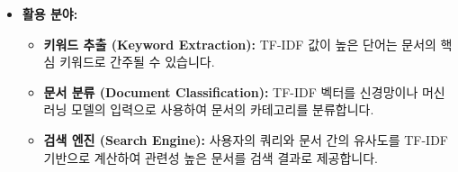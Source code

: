 \documentclass[11pt,a4paper]{article}
\theoremstyle{definition}
\begin{document}
\begin{itemize}
\begin{itemize}
        \item \textbf{목적:} 계산된 TF-IDF 벡터의 길이를 1로 만들어 단위 벡터(unit vector)로 변환합니다.
        \item \textbf{방법:} 각 벡터의 모든 요소를 해당 벡터의 L2 노름(Euclidean distance, 유클리드 거리)으로 나눕니다.
        $$ \text{정규화된 벡터 } \mathbf{v}' = \frac{\mathbf{v}}{||\mathbf{v}||_2} $$
        \item \textbf{L2 노름:} $||\mathbf{v}||_2 = \sqrt{v_1^2 + v_2^2 + \dots + v_k^2}$
        \item \textbf{효과:}
            \begin{itemize}
                \item \textbf{문서 길이의 영향 감소:} 문서의 길이가 길다고 해서 TF-IDF 벡터의 길이가 무조건 길어지는 것을 방지합니다.
                \item \textbf{방향성 강조:} 벡터의 '방향'에 초점을 맞춰 문서 간의 유사도를 측정할 때 '코사인 유사성(Cosine Similarity)'을 직접적으로 사용할 수 있게 합니다. 두 단위 벡터의 내적(dot product)은 두 벡터 사이의 코사인 값과 동일합니다.
                \item \textbf{모델 안정성:} 신경망의 입력으로 사용될 때, 입력 값의 스케일을 일정하게 유지하여 학습의 안정성을 높일 수 있습니다.
            \end{itemize}
        \item \textbf{논의:} TF 계산 시 이미 문서 길이로 나누어 정규화하는데, 최종적으로 다시 벡터 정규화를 하는 것이 중복이 아닌가 하는 의문이 있을 수 있습니다. 하지만 TF는 '단어 빈도'를 문서 길이로 정규화하는 것이고, 최종 벡터 정규화는 '문서 전체의 TF-IDF 벡터'의 길이를 정규화하는 것으로, 서로 다른 목적을 가집니다. 경험적으로 두 가지 정규화를 모두 적용하는 것이 좋은 성능을 보이는 경우가 많습니다.
    \end{itemize}
    \item \textbf{활용 분야:}
    \begin{itemize}
        \item \textbf{키워드 추출 (Keyword Extraction):} TF-IDF 값이 높은 단어는 문서의 핵심 키워드로 간주될 수 있습니다.
        \item \textbf{문서 분류 (Document Classification):} TF-IDF 벡터를 신경망이나 머신러닝 모델의 입력으로 사용하여 문서의 카테고리를 분류합니다.
        \item \textbf{검색 엔진 (Search Engine):} 사용자의 쿼리와 문서 간의 유사도를 TF-IDF 기반으로 계산하여 관련성 높은 문서를 검색 결과로 제공합니다.
    \end{itemize}
\end{itemize}
\end{document}
